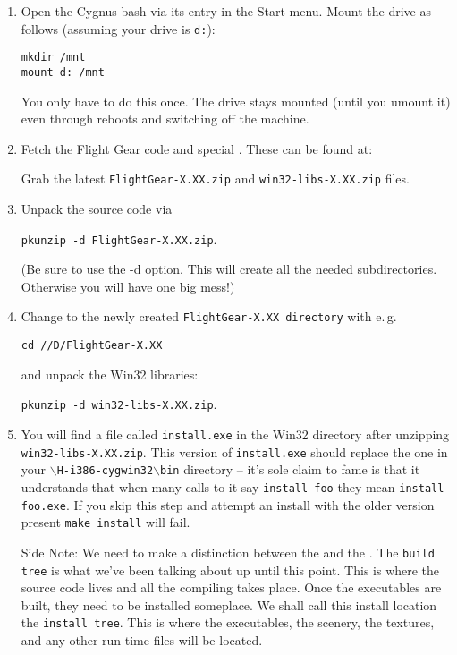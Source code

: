 \begin{enumerate}
\item  Open the Cygnus bash via its entry in the Start menu.
    Mount the drive as follows (assuming your \FlightGear drive is \texttt{d:}):

         \texttt{mkdir /mnt}\\
         \texttt{mount d: /mnt}

 \noindent
    You only have to do this once. The drive stays mounted (until you
    umount it) even through reboots and switching off the machine.


\item  Fetch the Flight Gear code and special .  These
can  be found at:



 \noindent
    Grab the latest \texttt{FlightGear-X.XX.zip} and
    \texttt{win32-libs-X.XX.zip} files.

\item Unpack the \FlightGear source code via

        \texttt{pkunzip -d FlightGear-X.XX.zip}.

 \noindent
    (Be sure to use the -d option.  This will create all the needed
    subdirectories.  Otherwise you will have one big mess!)

\item  Change to the newly created \texttt{FlightGear-X.XX directory} with e.\,g.

\texttt{cd //D/FlightGear-X.XX}

 and unpack the Win32 libraries:

     \texttt{pkunzip -d win32-libs-X.XX.zip}.


\item  You will find a file called \texttt{install.exe} in the Win32
directory after unzipping \texttt{win32-libs-X.XX.zip}. This
version of \texttt{install.exe} should replace the one in your
$\backslash$\texttt{H-i386-cygwin32$\backslash$bin} directory --
it's sole claim to fame is that it understands that when many
calls to it say \texttt{install foo} they mean \texttt{install
foo.exe}. If you skip this step and attempt an install with the
older version present \texttt{make install} will fail.

Side Note: We need to make a distinction between the
\texttt{} and the \texttt{}.
The \texttt{build tree} is what we've been talking about up until
this point.  This is where the source code lives and all the
compiling takes place.  Once the executables are built, they need
to be installed someplace.  We shall call this install location
the \texttt{install tree}.  This is where the executables, the
scenery, the textures, and any other run-time files will be
located.


\end{enumerate}
